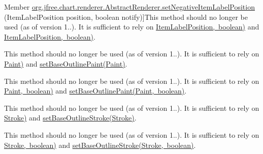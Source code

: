 \begin{DoxyRefList}
%
Member \mbox{\hyperlink{classorg_1_1jfree_1_1chart_1_1renderer_1_1_abstract_renderer_aea75a4da8fcbdd4db4e28c5fe5659ec1}{org.jfree.chart.renderer.Abstract\+Renderer.set\+Negative\+Item\+Label\+Position}} (Item\+Label\+Position position, boolean notify)]This method should no longer be used (as of version 1..). It is sufficient to rely on \mbox{\hyperlink{}{Item\+Label\+Position, boolean)}} and \mbox{\hyperlink{}{Item\+Label\+Position, boolean)}}.  
\item[\label{deprecated__deprecated000120}%
\Hypertarget{deprecated__deprecated000120}%
Member \mbox{\hyperlink{classorg_1_1jfree_1_1chart_1_1renderer_1_1_abstract_renderer_af12d47fe216d03827398ea257e11b8b3}{org.jfree.chart.renderer.Abstract\+Renderer.set\+Outline\+Paint}} (Paint paint)]This method should no longer be used (as of version 1..). It is sufficient to rely on \mbox{\hyperlink{}{Paint)}} and \mbox{\hyperlink{classorg_1_1jfree_1_1chart_1_1renderer_1_1_abstract_renderer_ab1a850a60c44c51d4cbaa83c294b2f86}{set\+Base\+Outline\+Paint(\+Paint)}}.  
\item[\label{deprecated__deprecated000121}%
\Hypertarget{deprecated__deprecated000121}%
Member \mbox{\hyperlink{classorg_1_1jfree_1_1chart_1_1renderer_1_1_abstract_renderer_a4e71d05784d1a3e4cbc2d7498f0383fd}{org.jfree.chart.renderer.Abstract\+Renderer.set\+Outline\+Paint}} (Paint paint, boolean notify)]This method should no longer be used (as of version 1..). It is sufficient to rely on \mbox{\hyperlink{}{Paint, boolean)}} and \mbox{\hyperlink{classorg_1_1jfree_1_1chart_1_1renderer_1_1_abstract_renderer_a3132fccedf5a5e1c07a003477aaf1109}{set\+Base\+Outline\+Paint(\+Paint, boolean)}}.  
\item[\label{deprecated__deprecated000124}%
\Hypertarget{deprecated__deprecated000124}%
Member \mbox{\hyperlink{classorg_1_1jfree_1_1chart_1_1renderer_1_1_abstract_renderer_a42996d497d13da2046b961fe6b5eedbb}{org.jfree.chart.renderer.Abstract\+Renderer.set\+Outline\+Stroke}} (Stroke stroke)]This method should no longer be used (as of version 1..). It is sufficient to rely on \mbox{\hyperlink{}{Stroke)}} and \mbox{\hyperlink{classorg_1_1jfree_1_1chart_1_1renderer_1_1_abstract_renderer_a8626e74d5ba48c73c39af03b289ea7a0}{set\+Base\+Outline\+Stroke(\+Stroke)}}.  
\item[\label{deprecated__deprecated000125}%
\Hypertarget{deprecated__deprecated000125}%
Member \mbox{\hyperlink{classorg_1_1jfree_1_1chart_1_1renderer_1_1_abstract_renderer_a4f54e760f281e2643ebab8f182214212}{org.jfree.chart.renderer.Abstract\+Renderer.set\+Outline\+Stroke}} (Stroke stroke, boolean notify)]This method should no longer be used (as of version 1..). It is sufficient to rely on \mbox{\hyperlink{}{Stroke, boolean)}} and \mbox{\hyperlink{classorg_1_1jfree_1_1chart_1_1renderer_1_1_abstract_renderer_ae9b788eee2ee4506c4fe4dd219465dbb}{set\+Base\+Outline\+Stroke(\+Stroke, boolean)}}.  

\end{DoxyRefList}
